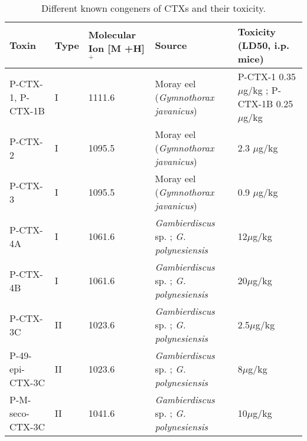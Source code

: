 \documentclass[12pt]{article}
\begin{document}

\begin{table}
\caption{Different known congeners of CTXs and their toxicity.}
\label{tbl:CTXTable}
\begin{tabular}{  | p{2cm} | p{1.5cm} | p{2.5cm} | p{4cm} | p{4cm} |}
\hline
\textbf{Toxin} & \textbf{Type} & \textbf{Molecular Ion [M +H]$^{+}$} & \textbf{Source} & \textbf{Toxicity (LD50, i.p. mice)} \\
\hline
P-CTX-1, P-CTX-1B & I & 1111.6 & Moray eel (\emph{Gymnothorax javanicus}) \cite{murata1990structures,lewis1991purification} & P-CTX-1 0.35 $\mu$g/kg \cite{murata1990structures}; P-CTX-1B 0.25$\mu$g/kg \cite{lewis1991purification} \\
\hline
P-CTX-2 & I & 1095.5 \cite{lewis1991purification} & Moray eel (\emph{Gymnothorax javanicus}) \cite{lewis1991purification} & 2.3 $\mu$g/kg \cite{lewis1991purification} \\
\hline
 P-CTX-3 & I & 1095.5 \cite{lewis1991purification} & Moray eel (\emph{Gymnothorax javanicus}) \cite{lewis1991purification} & 0.9 $\mu$g/kg \cite{lewis1991purification} \\
 \hline
 P-CTX-4A & I & 1061.6 \cite{yasumoto2000structural} & \emph{Gambierdiscus} sp. \cite{yasumoto2000structural}; \emph{G. polynesiensis} \cite{chinain2010growth} & 12$\mu$g/kg \cite{chinain2010growth} \\
 \hline
 P-CTX-4B & I & 1061.6 \cite{yasumoto2000structural} & \emph{Gambierdiscus} sp. \cite{yasumoto2000structural}; \emph{G. polynesiensis} \cite{chinain2010growth} & 20$\mu$g/kg \cite{chinain2010growth}\\
 \hline
 P-CTX-3C & II & 1023.6 \cite{satake1993structure} &  \emph{Gambierdiscus} sp. \cite{satake1993structure}; \emph{G. polynesiensis} \cite{chinain2010growth} & 2.5$\mu$g/kg \cite{chinain2010growth}\\
 \hline
 P-49-epi-CTX-3C & II & 1023.6 \cite{chinain2010growth} & \emph{Gambierdiscus} sp. \cite{satake1993structure}; \emph{G. polynesiensis} \cite{chinain2010growth} & 8$\mu$g/kg\cite{chinain2010growth}\\
 \hline
 P-M-seco-CTX-3C & II & 1041.6 \cite{chinain2010growth} &\emph{Gambierdiscus} sp. \cite{satake1993structure}; \emph{G. polynesiensis} \cite{chinain2010growth} & 10$\mu$g/kg \cite{chinain2010growth}\\

\end{tabular}
\end{table}
\end{document}
